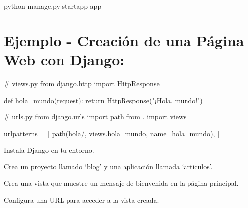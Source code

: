 \documentclass[
  a4paper,
  onepage,
  openany]{scrreprt}
\newenvironment{Shaded}{\begin{snugshade}}{\end{snugshade}}
\newcommand{\CommentTok}[1]{\textcolor[rgb]{0.37,0.37,0.37}{#1}}
\newcommand{\ControlFlowTok}[1]{\textcolor[rgb]{0.00,0.23,0.31}{#1}}
\newcommand{\ExtensionTok}[1]{\textcolor[rgb]{0.00,0.23,0.31}{#1}}
\newcommand{\ImportTok}[1]{\textcolor[rgb]{0.00,0.46,0.62}{#1}}
\newcommand{\KeywordTok}[1]{\textcolor[rgb]{0.00,0.23,0.31}{#1}}
\newcommand{\NormalTok}[1]{\textcolor[rgb]{0.00,0.23,0.31}{#1}}
\newcommand{\OperatorTok}[1]{\textcolor[rgb]{0.37,0.37,0.37}{#1}}
\newcommand{\StringTok}[1]{\textcolor[rgb]{0.13,0.47,0.30}{#1}}
\begin{document}
\begin{Shaded}
\begin{Highlighting}[]
\ExtensionTok{python}\NormalTok{ manage.py startapp app}
\end{Highlighting}
\end{Shaded}

\hypertarget{ejemplo---creaciuxf3n-de-una-puxe1gina-web-con-django-1}{%
\section{Ejemplo - Creación de una Página Web con
Django:}\label{ejemplo---creaciuxf3n-de-una-puxe1gina-web-con-django-1}}

\begin{Shaded}
\begin{Highlighting}[]
\CommentTok{\# views.py}
\ImportTok{from}\NormalTok{ django.http }\ImportTok{import}\NormalTok{ HttpResponse}

\KeywordTok{def}\NormalTok{ hola\_mundo(request):}
    \ControlFlowTok{return}\NormalTok{ HttpResponse(}\StringTok{"¡Hola, mundo!"}\NormalTok{)}
\end{Highlighting}
\end{Shaded}

\begin{Shaded}
\begin{Highlighting}[]
\CommentTok{\# urls.py}
\ImportTok{from}\NormalTok{ django.urls }\ImportTok{import}\NormalTok{ path}
\ImportTok{from}\NormalTok{ . }\ImportTok{import}\NormalTok{ views}

\NormalTok{urlpatterns }\OperatorTok{=}\NormalTok{ [}
\NormalTok{    path(}\StringTok{\textquotesingle{}hola/\textquotesingle{}}\NormalTok{, views.hola\_mundo, name}\OperatorTok{=}\StringTok{\textquotesingle{}hola\_mundo\textquotesingle{}}\NormalTok{),}
\NormalTok{]}
\end{Highlighting}
\end{Shaded}

\begin{tcolorbox}[enhanced jigsaw, breakable, opacityback=0, toptitle=1mm, coltitle=black, toprule=.15mm, rightrule=.15mm, colframe=quarto-callout-important-color-frame, opacitybacktitle=0.6, arc=.35mm, title=\textcolor{quarto-callout-important-color}{\faExclamation}\hspace{0.5em}{Actividad Práctica:}, titlerule=0mm, colbacktitle=quarto-callout-important-color!10!white, bottomtitle=1mm, bottomrule=.15mm, colback=white, left=2mm, leftrule=.75mm]

Instala Django en tu entorno.

Crea un proyecto llamado `blog' y una aplicación llamada `articulos'.

Crea una vista que muestre un mensaje de bienvenida en la página
principal.

Configura una URL para acceder a la vista creada.

\end{tcolorbox}
\end{document}
